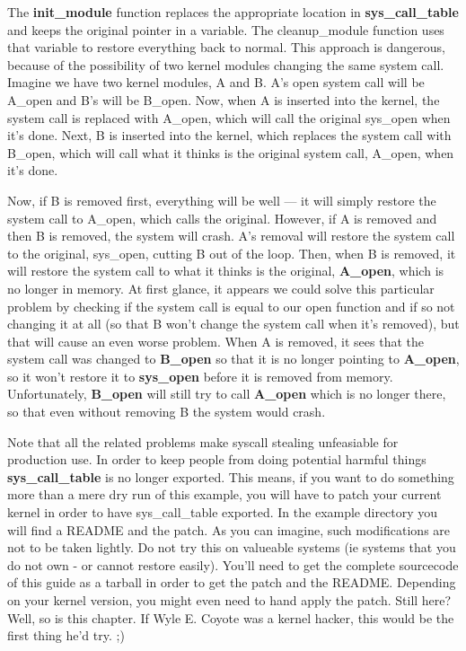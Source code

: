 \documentclass[11pt]{article}
\begin{document}
The \textbf{init\_module} function replaces the appropriate location in \textbf{sys\_call\_table} and keeps the original pointer in a variable. The cleanup\_module function uses that variable to restore everything back to normal. This approach is dangerous, because of the possibility of two kernel modules changing the same system call. Imagine we have two kernel modules, A and B. A's open system call will be A\_open and B's will be B\_open. Now, when A is inserted into the kernel, the system call is replaced with A\_open, which will call the original sys\_open when it's done. Next, B is inserted into the kernel, which replaces the system call with B\_open, which will call what it thinks is the original system call, A\_open, when it's done.

Now, if B is removed first, everything will be well --- it will simply restore the system call to A\_open, which calls the original. However, if A is removed and then B is removed, the system will crash. A's removal will restore the system call to the original, sys\_open, cutting B out of the loop. Then, when B is removed, it will restore the system call to what it thinks is the original, \textbf{A\_open}, which is no longer in memory. At first glance, it appears we could solve this particular problem by checking if the system call is equal to our open function and if so not changing it at all (so that B won't change the system call when it's removed), but that will cause an even worse problem. When A is removed, it sees that the system call was changed to \textbf{B\_open} so that it is no longer pointing to \textbf{A\_open}, so it won't restore it to \textbf{sys\_open} before it is removed from memory. Unfortunately, \textbf{B\_open} will still try to call \textbf{A\_open} which is no longer there, so that even without removing B the system would crash.

Note that all the related problems make syscall stealing unfeasiable for production use. In order to keep people from doing potential harmful things \textbf{sys\_call\_table} is no longer exported. This means, if you want to do something more than a mere dry run of this example, you will have to patch your current kernel in order to have sys\_call\_table exported. In the example directory you will find a README and the patch. As you can imagine, such modifications are not to be taken lightly. Do not try this on valueable systems (ie systems that you do not own - or cannot restore easily). You'll need to get the complete sourcecode of this guide as a tarball in order to get the patch and the README. Depending on your kernel version, you might even need to hand apply the patch. Still here? Well, so is this chapter. If Wyle E. Coyote was a kernel hacker, this would be the first thing he'd try. ;)
\end{document}
